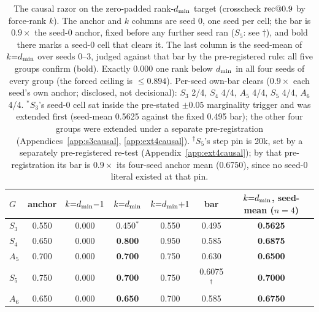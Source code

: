 \begin{table}[t]
\centering
\footnotesize
\setlength{\tabcolsep}{5pt}
\begin{tabular}{lcccccc}
\toprule
$G$ & anchor & $k{=}d_{\min}{-}1$ & $k{=}d_{\min}$ & $k{=}d_{\min}{+}1$ & bar & $k{=}d_{\min}$, seed-mean ($n{=}4$) \\
\midrule
$S_3$ & 0.550 & 0.000 & 0.450$^{\ast}$ & 0.550 & 0.495 & \textbf{0.5625} \\
$S_4$ & 0.650 & 0.000 & \textbf{0.800} & 0.950 & 0.585 & \textbf{0.6875} \\
$A_5$ & 0.700 & 0.000 & \textbf{0.700} & 0.750 & 0.630 & \textbf{0.6500} \\
$S_5$ & 0.750 & 0.000 & \textbf{0.700} & 0.750 & 0.6075$^{\dagger}$ & \textbf{0.7000} \\
$A_6$ & 0.650 & 0.000 & \textbf{0.650} & 0.700 & 0.585 & \textbf{0.6750} \\
\bottomrule
\end{tabular}
\caption{The causal razor on the zero-padded rank-$d_{\min}$ target
(crosscheck $\mathrm{rec}@0.9$ by force-rank $k$). The anchor and $k$
columns are seed 0, one seed per cell; the bar is $0.9\times$ the seed-0
anchor, fixed before any further seed ran ($S_5$: see $\dagger$), and
bold there marks a seed-0 cell that clears it. The last column is the
seed-mean of $k{=}d_{\min}$ over seeds 0--3, judged against that bar by
the pre-registered rule: all five groups confirm (bold). Exactly 0.000
one rank below $d_{\min}$ in all four seeds of every group (the forced
ceiling is $\le 0.894$). Per-seed own-bar clears ($0.9\times$ each
seed's own anchor; disclosed, not decisional): $S_3$ 2/4, $S_4$ 4/4,
$A_5$ 4/4, $S_5$ 4/4, $A_6$ 4/4.
$^{\ast}$$S_3$'s seed-0 cell sat inside the pre-stated $\pm 0.05$
marginality trigger and was extended first (seed-mean 0.5625 against
the fixed 0.495 bar); the other four groups were extended under a
separate pre-registration (Appendices~\ref{app:s3causal},
\ref{app:ext4causal}).
$^{\dagger}$$S_5$'s step pin is 20k, set by a separately
pre-registered re-test (Appendix~\ref{app:ext4causal}); by that
pre-registration its bar is $0.9\times$ its four-seed anchor mean
(0.6750), since no seed-0 literal existed at that pin.}
\label{tab:razor}
\end{table}

